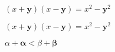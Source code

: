 \documentclass[a4paper]{article}
\begin{document}
$(x+\mathbf{y})(x-\mathbf{y})=x^{2}-{\mathbf{y}}^{2}$

$(x+\bm{y})(x-\bm{y}) \bm{=} x^{2}-{\bm{y}}^{2}$

$\alpha + \bm{\alpha} < \beta + \bm{\beta}$
\end{document}
